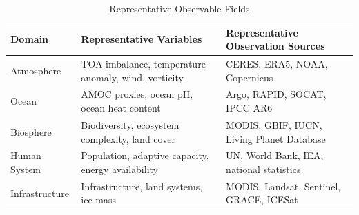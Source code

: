\begin{table}
\centering
\caption{Representative Observable Fields}
\label{tab:observable_fields}
\begin{tabular}{p{}p{}p{}}
\hline
Domain & Representative Variables & Representative Observation Sources \\
\hline
Atmosphere & TOA imbalance, temperature anomaly, wind, vorticity & CERES, ERA5, NOAA, Copernicus \\
Ocean & AMOC proxies, ocean pH, ocean heat content & Argo, RAPID, SOCAT, IPCC AR6 \\
Biosphere & Biodiversity, ecosystem complexity, land cover & MODIS, GBIF, IUCN, Living Planet Database \\
Human System & Population, adaptive capacity, energy availability & UN, World Bank, IEA, national statistics \\
Infrastructure & Infrastructure, land systems, ice mass & MODIS, Landsat, Sentinel, GRACE, ICESat \\
\hline
\end{tabular}
\end{table}
